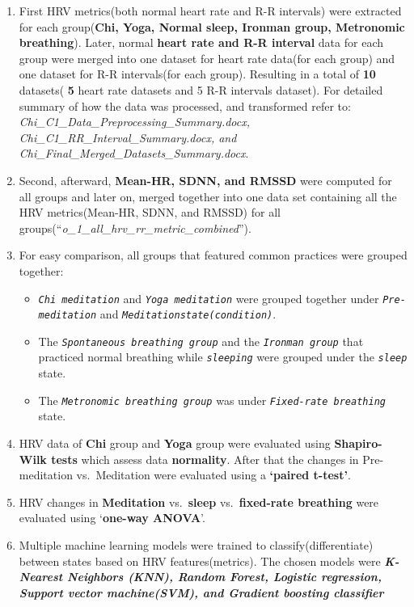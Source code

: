\documentclass[
  11pt,
]{ieee}
\begin{document}
\begin{enumerate}
\def\labelenumi{\arabic{enumi}.}
\item
  First HRV metrics(both normal heart rate and R-R intervals) were
  extracted for each group(\textbf{Chi, Yoga, Normal sleep, Ironman
  group, Metronomic breathing}). Later, normal \textbf{heart rate and
  R-R interval} data for each group were merged into one dataset for
  heart rate data(for each group) and one dataset for R-R intervals(for
  each group). Resulting in a total of \textbf{10} datasets( \textbf{5}
  heart rate datasets and 5 R-R intervals dataset). For detailed summary
  of how the data was processed, and transformed refer to:
  \emph{Chi\_C1\_Data\_Preprocessing\_Summary.docx,
  Chi\_C1\_RR\_Interval\_Summary.docx, and
  Chi\_Final\_Merged\_Datasets\_Summary.docx}.
\item
  Second, afterward, \textbf{Mean-HR, SDNN, and RMSSD} were computed for
  all groups and later on, merged together into one data set containing
  all the HRV metrics(Mean-HR, SDNN, and RMSSD) for all
  groups(``\emph{o\_1\_all\_hrv\_rr\_metric\_combined}'').\\
\item
  For easy comparison, all groups that featured common practices were
  grouped together:

  \begin{itemize}
  \item
    \emph{\texttt{Chi\ meditation}} and \emph{\texttt{Yoga\ meditation}}
    were grouped together under \emph{\texttt{Pre-meditation}} and
    \emph{\texttt{Meditationstate(condition)}}.
  \item
    The \emph{\texttt{Spontaneous\ breathing\ group}} and the
    \emph{\texttt{Ironman\ group}} that practiced normal breathing while
    \emph{\texttt{sleeping}} were grouped under the
    \emph{\texttt{sleep}} state.
  \item
    The \emph{\texttt{Metronomic\ breathing\ group}} was under
    \emph{\texttt{Fixed-rate\ breathing}} state.
  \end{itemize}
\item
  HRV data of \textbf{Chi} group and \textbf{Yoga} group were evaluated
  using \textbf{Shapiro-Wilk tests} which assess data
  \textbf{normality}. After that the changes in Pre-meditation
  vs.~Meditation were evaluated using a \textbf{`paired t-test'}.
\item
  HRV changes in \textbf{Meditation} vs.~\textbf{sleep}
  vs.~\textbf{fixed-rate breathing} were evaluated using
  `\textbf{one-way ANOVA}'.
\item
  Multiple machine learning models were trained to
  classify(differentiate) between states based on HRV features(metrics).
  The chosen models were \textbf{\emph{K-Nearest Neighbors (KNN), Random
  Forest, Logistic regression, Support vector machine(SVM), and Gradient
  boosting classifier}}
\end{enumerate}
\end{document}
